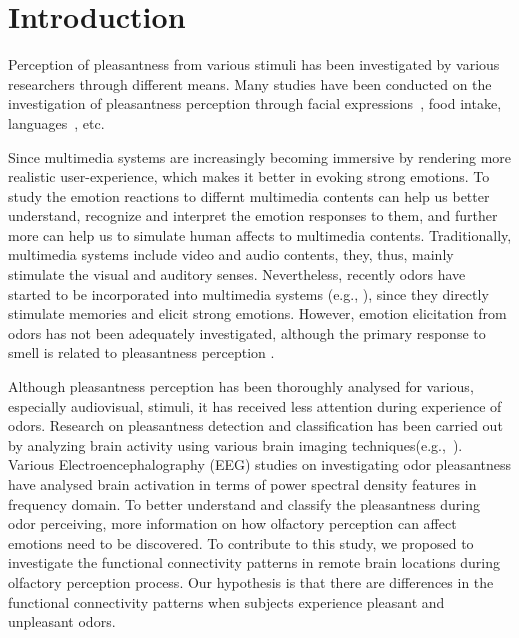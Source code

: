 \section{Introduction}


Perception of pleasantness from various stimuli has been investigated by various researchers through different means. Many studies have been conducted on the investigation of pleasantness perception through facial expressions~\cite{lyons1998coding}, food intake\cite{de2003taste}, languages~\cite{bellezza1986words}, etc.


Since multimedia systems are increasingly becoming immersive by rendering more realistic user-experience, which makes it better in evoking strong emotions. To study the emotion reactions to differnt multimedia contents can help us better understand, recognize and interpret the emotion responses to them, and further more can help us to simulate human affects to multimedia contents. Traditionally, multimedia systems include video and audio contents, they, thus, mainly stimulate the visual and auditory senses. Nevertheless, recently odors have started to be incorporated into multimedia systems (e.g., \cite{nakamoto2011olfactory,nakamoto2008cooking,richard2006multi}), since they directly stimulate memories and elicit strong emotions. However, emotion elicitation from odors has not been adequately investigated, although the primary response to smell is related to pleasantness perception \cite{gulas1995right}. 


Although pleasantness perception has been thoroughly analysed for various, especially audiovisual, stimuli, it has received less attention during experience of odors. Research on pleasantness detection and classification has been carried out by analyzing brain activity using various brain imaging techniques(e.g.,~\cite{zatorre2000neural,kringelbach2003activation,kroupi2014eeg}). Various Electroencephalography (EEG) studies on investigating odor pleasantness have analysed brain activation in terms of power spectral density features in frequency domain. To better understand and classify the pleasantness during odor perceiving, more information on how olfactory perception can affect emotions need to be discovered. To contribute to this study, we proposed to investigate the functional connectivity patterns in remote brain locations during olfactory perception process. Our hypothesis is that there are differences in the functional connectivity patterns when subjects experience pleasant and unpleasant odors. 

